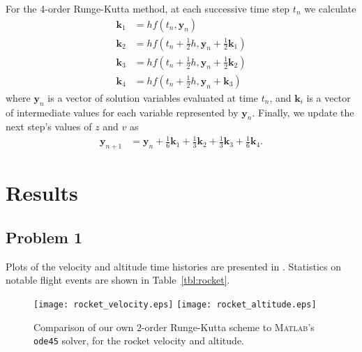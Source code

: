 \documentclass[12pt]{article}
\begin{document}
For the 4\th-order Runge-Kutta method, at each successive time step $t_n$ we calculate
\begin{equation}
\begin{aligned}
\mathbf{k}_1 &= h f(t_n, \mathbf{y}_n)
\\
\mathbf{k}_2 &= h f(t_n + \tfrac{1}{2} h, \mathbf{y}_n + \tfrac{1}{2} \mathbf{k}_1)
\\
\mathbf{k}_3 &= h f(t_n + \tfrac{1}{2} h, \mathbf{y}_n + \tfrac{1}{2} \mathbf{k}_2)
\\
\mathbf{k}_4 &= h f(t_n + \tfrac{1}{2} h, \mathbf{y}_n + \mathbf{k}_3)
\end{aligned}
\end{equation}
where $\mathbf{y}_n$ is a vector of solution variables evaluated at time $t_n$, and $\mathbf{k}_i$ is a vector of intermediate values for each variable represented by $\mathbf{y}_n$. Finally, we update the next step's values of $z$ and $v$ as
\begin{equation}
\begin{aligned}
\mathbf{y}_{n+1} &= \mathbf{y}_n + \tfrac{1}{6} \mathbf{k}_1 + \tfrac{1}{3} \mathbf{k}_2 + \tfrac{1}{3} \mathbf{k}_3 + \tfrac{1}{6} \mathbf{k}_4
.
\end{aligned}
\end{equation}

\section{Results} %

\subsection{Problem 1}

Plots of the velocity and altitude time histories are presented in . Statistics on notable flight events are shown in Table~\ref{tbl:rocket}.

\begin{figure}[t]
\begin{center}
\texttt{[image: rocket\_velocity.eps]}
\texttt{[image: rocket\_altitude.eps]}
\\[6pt]
\caption{Comparison of our own 2\nd-order Runge-Kutta scheme to \textsc{Matlab}'s \lstinline|ode45| solver, for the rocket velocity and altitude.}
\label{fig:rocket_plots}
\end{center}
\end{figure}
\end{document}
